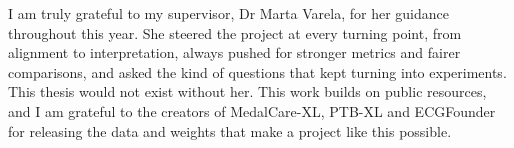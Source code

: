 I am truly grateful to my supervisor, Dr Marta Varela, for her guidance throughout this year. She steered the project at every turning point, from alignment to interpretation, always pushed for stronger metrics and fairer comparisons, and asked the kind of questions that kept turning into experiments. This thesis would not exist without her. This work builds on public resources, and I am grateful to the creators of MedalCare-XL, PTB-XL and ECGFounder for releasing the data and weights that make a project like this possible.
